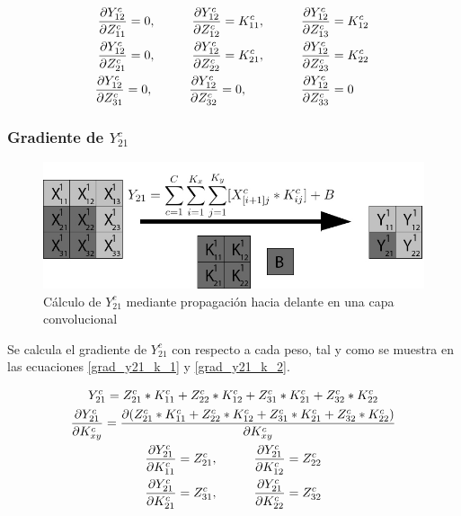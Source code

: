 \begin{gather}
	\frac{\partial Y^c_{12}}{\partial Z^c_{11}} = 0, \hspace{10mm} \frac{\partial Y^c_{12}}{\partial Z^c_{12}} = K^c_{11}, \hspace{10mm} \frac{\partial Y^c_{12}}{\partial Z^c_{13}} = K^c_{12} \label{grad_y12_z_1} \\
	\frac{\partial Y^c_{12}}{\partial Z^c_{21}} = 0, \hspace{10mm} \frac{\partial Y^c_{12}}{\partial Z^c_{22}} = K^c_{21}, \hspace{10mm} \frac{\partial Y^c_{12}}{\partial Z^c_{23}} = K^c_{22} \label{grad_y12_z_2} \\
	\frac{\partial Y^c_{12}}{\partial Z^c_{31}} = 0, \hspace{10mm} \frac{\partial Y^c_{12}}{\partial Z^c_{32}} = 0, \hspace{15mm} \frac{\partial Y^c_{12}}{\partial Z^c_{33}} = 0 \hspace{5mm} \label{grad_y12_z_3}
\end{gather}

\subsubsection{Gradiente de $Y^c_{21}$}

\begin{figure}[H]
	\centering
	\includegraphics[width=1\linewidth]{imagenes/conv_ejemplo_backprop_3.jpg} 
	\caption{Cálculo de $Y^c_{21}$ mediante propagación hacia delante en una capa convolucional}
	\label{fig:ejemplo_3_forward_prop_convolucional}
\end{figure}

Se calcula el gradiente de $Y^c_{21}$ con respecto a cada peso, tal y como se muestra en las ecuaciones \ref{grad_y21_k_1} y \ref{grad_y21_k_2}.

\begin{gather}
	Y^c_{21} = Z^c_{21} * K^c_{11} + Z^c_{22} * K^c_{12} + Z^c_{31} * K^c_{21} + Z^c_{32} * K^c_{22} \\
	\frac{\partial Y^c_{21}}{\partial K^c_{xy}} = \frac{\partial (Z^c_{21} * K^c_{11} + Z^c_{22} * K^c_{12} + Z^c_{31} * K^c_{21} + Z^c_{32} * K^c_{22})}{\partial K^c_{xy}} \\
	\frac{\partial Y^c_{21}}{\partial K^c_{11}} = Z^c_{21}, \hspace{10mm} \frac{\partial Y^c_{21}}{\partial K^c_{12}} = Z^c_{22} \label{grad_y21_k_1} \\
	\frac{\partial Y^c_{21}}{\partial K^c_{21}} = Z^c_{31}, \hspace{10mm} \frac{\partial Y^c_{21}}{\partial K^c_{22}} = Z^c_{32} \label{grad_y21_k_2}
\end{gather}

